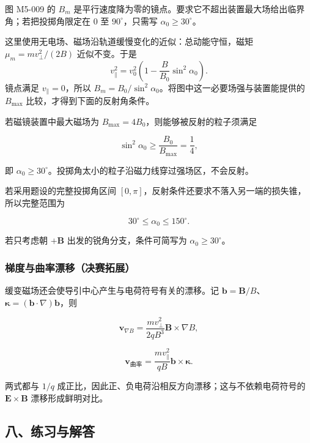 图 M5-009 的 \(B_m\)
是平行速度降为零的镜点。要求它不超出装置最大场给出临界角；若把投掷角限定在
\(0\) 至 \(90^{\circ}\)，只需写 \(\alpha_0\ge30^{\circ}\)。

这里使用无电场、磁场沿轨道缓慢变化的近似：总动能守恒，磁矩
\(\mu_m=mv_{\perp}^2/(2B)\) 近似不变。于是 \[
v_{\parallel}^2=v_0^2\left(1-\frac{B}{B_0}\sin^2\alpha_0\right).
\] 镜点满足 \(v_{\parallel}=0\)，所以
\(B_m=B_0/\sin^2\alpha_0\)。将图中这一必要场强与装置能提供的
\(B_{\max}\) 比较，才得到下面的反射角条件。

若磁镜装置中最大磁场为 \(B_{\max}=4B_0\)，则能够被反射的粒子须满足

\[
\sin^2\alpha_0\ge\frac{B_0}{B_{\max}}=\frac14,
\]

即
\(\alpha_0\ge30^{\circ}\)。投掷角太小的粒子沿磁力线穿过强场区，不会反射。

若采用题设的完整投掷角区间
\([0,\pi]\)，反射条件还要求不落入另一端的损失锥，所以完整范围为

\[
30^{\circ}\le\alpha_0\le150^{\circ}.
\]

若只考虑朝 \(+\mathbf B\) 出发的锐角分支，条件可简写为
\(\alpha_0\ge30^{\circ}\)。

\subsubsection{梯度与曲率漂移（决赛拓展）}\label{m5:ux68afux5ea6ux4e0eux66f2ux7387ux6f02ux79fbux51b3ux8d5bux62d3ux5c55}

缓变磁场还会使导引中心产生与电荷符号有关的漂移。记
\(\mathbf b=\mathbf B/B\)、\(\boldsymbol\kappa=(\mathbf b\cdot\nabla)\mathbf b\)，则

\[
\boxed{
\mathbf v_{\nabla B}
=\frac{mv_{\perp}^2}{2qB^3}\mathbf B\times\nabla B
},
\]

\[
\boxed{
\mathbf v_{\text{曲率}}
=\frac{mv_{\parallel}^2}{qB}\mathbf b\times\boldsymbol\kappa
}.
\]

两式都与 \(1/q\)
成正比，因此正、负电荷沿相反方向漂移；这与不依赖电荷符号的
\(\mathbf E\times\mathbf B\) 漂移形成鲜明对比。

\subsection{八、练习与解答}\label{m5:ux516bux7ec3ux4e60ux4e0eux89e3ux7b54}

